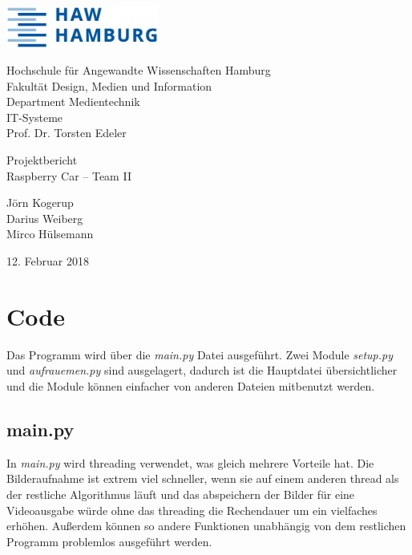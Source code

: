 \documentclass[a4paper, 12pt]{scrartcl}
\begin{document}
	\thispagestyle{empty}
	\begin{flushright}
		\includegraphics[width=5cm]{HAW_Logo.eps}
	\end{flushright}
	Hochschule für Angewandte Wissenschaften Hamburg\\
	Fakultät Design, Medien und Information\\
	Department Medientechnik\\[1ex]
	IT-Systeme\\
	Prof. Dr. Torsten Edeler
	
	\vspace{1cm}
	\begin{center}
		\large{Projektbericht}\\
		\LARGE{Raspberry Car -- Team II}
		
		\vspace{2ex}
		\large{	Jörn Kogerup\\
				Darius Weiberg\\
				Mirco Hülsemann}
		
		\vspace{2ex}
		\large{12. Februar 2018}
		
	\end{center}

\newpage
\tableofcontents
\newpage

\section{Code}

Das Programm wird über die \textit{main.py} Datei ausgeführt. Zwei Module \textit{setup.py} und \textit{aufrauemen.py} sind ausgelagert, dadurch ist die Hauptdatei übersichtlicher und die Module können einfacher von anderen Dateien mitbenutzt werden.

\subsection{main.py}

In \textit{main.py} wird threading verwendet, was gleich mehrere Vorteile hat. Die Bilderaufnahme ist extrem viel schneller, wenn sie auf einem anderen thread als der restliche Algorithmus läuft und das abspeichern der Bilder für eine Videoausgabe würde ohne das threading die Rechendauer um ein vielfaches erhöhen. Außerdem können so andere Funktionen unabhängig von dem restlichen Programm problemlos ausgeführt werden.
\end{document}
